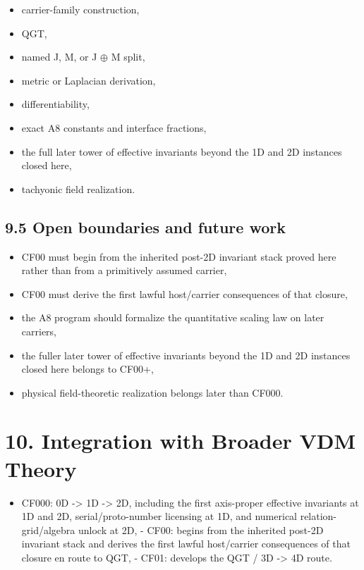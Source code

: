 \documentclass[11pt]{article}
\providecommand{\tightlist}{%
  \setlength{\itemsep}{1pt}\setlength{\parskip}{0pt}}
\begin{document}
\begin{itemize}
\item
  carrier-family construction,
\item
  QGT,
\item
  named J, M, or J $\oplus$ M split,
\item
  metric or Laplacian derivation,
\item
  differentiability,
\item
  exact A8 constants and interface fractions,
\item
  the full later tower of effective invariants beyond the 1D and 2D instances closed here,
\item
  tachyonic field realization.
\end{itemize}

\subsection{9.5 Open boundaries and future work}\label{open-boundaries-and-future-work}

\begin{itemize}
\item
  CF00 must begin from the inherited post-2D invariant stack proved here rather than from a primitively assumed carrier,
\item
  CF00 must derive the first lawful host/carrier consequences of that closure,
\item
  the A8 program should formalize the quantitative scaling law on later carriers,
\item
  the fuller later tower of effective invariants beyond the 1D and 2D instances closed here belongs to CF00+,
\item
  physical field-theoretic realization belongs later than CF000.
\end{itemize}

\section{10. Integration with Broader VDM Theory}\label{integration-with-broader-vdm-theory}

\begin{itemize}
\tightlist
\item
  CF000: 0D -\textgreater{} 1D -\textgreater{} 2D, including the first axis-proper effective invariants at 1D and 2D, serial/proto-number licensing at 1D, and numerical relation-grid/algebra unlock at 2D, - CF00: begins from the inherited post-2D invariant stack and derives the first lawful host/carrier consequences of that closure en route to QGT, - CF01: develops the QGT / 3D -\textgreater{} 4D route.
\end{itemize}
\end{document}
